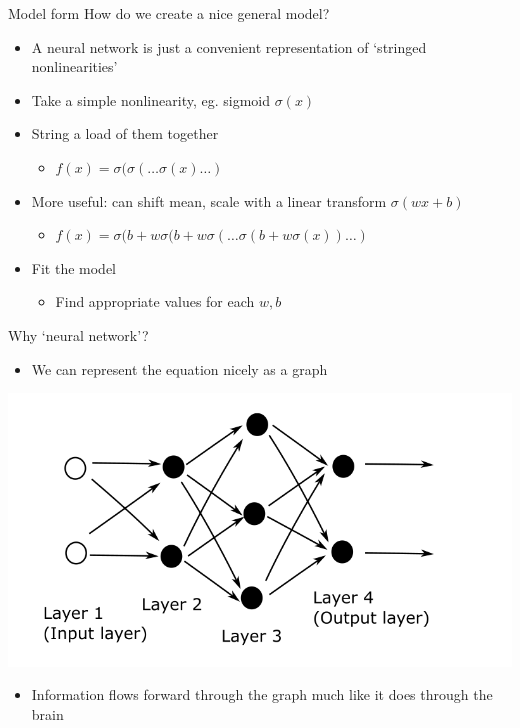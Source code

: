 \documentclass[presentation]{beamer}
\begin{document}
\begin{frame}[<+->][label={sec:org2ea6b2d}]{Model form}
How do we create a nice general model?
\vfill
\begin{itemize}
\item A neural network is just a convenient representation of `stringed nonlinearities'
\item Take a simple nonlinearity, eg. sigmoid \(\sigma(x)\)
\item String a load of them together
\begin{itemize}
\item \(f(x) = \sigma(\sigma(\dots\sigma(x)\dots)\)
\end{itemize}
\item More useful: can shift mean, scale with a linear transform \(\sigma(wx + b)\)
\begin{itemize}
\item \(f(x) = \sigma(b + w\sigma(b + w\sigma( \dots \sigma(b + w\sigma(x)) \dots )\)
\end{itemize}
\item Fit the model
\begin{itemize}
\item Find appropriate values for each \(w, b\)
\end{itemize}
\end{itemize}
\end{frame}

\begin{frame}[label={sec:orgdcec713}]{Why `neural network'?}
\begin{itemize}
\item We can represent the equation nicely as a graph
\end{itemize}
\vspace{-.3cm}
\begin{center}
\includegraphics[height=.7\textheight]{./net.png}
\end{center}      
\vspace{-.7cm}
\begin{itemize}
\item Information flows forward through the graph much like it does through the brain
\end{itemize}
\end{frame}
\end{document}
